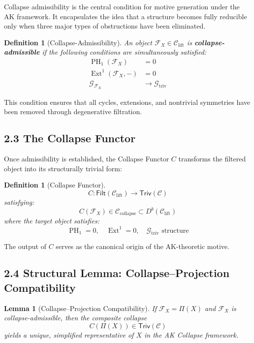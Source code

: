 \documentclass[11pt]{article}
\newtheorem{definition}[theorem]{Definition}
\newtheorem{lemma}[theorem]{Lemma}
\DeclareMathOperator{\Ext}{Ext}
\DeclareMathOperator{\PH}{PH}
\begin{document}
Collapse admissibility is the central condition for motive generation under the AK framework. It encapsulates the idea that a structure becomes fully reducible only when three major types of obstructions have been eliminated.

\begin{definition}[Collapse-Admissibility]
An object $\mathcal{F}_X \in \mathcal{C}_{\mathrm{lift}}$ is \textbf{collapse-admissible} if the following conditions are simultaneously satisfied:
\begin{align}
\PH_1(\mathcal{F}_X) &= 0 \tag{Topological Collapse} \\
\Ext^1(\mathcal{F}_X, -) &= 0 \tag{Categorical Collapse} \\
\mathcal{G}_{\mathcal{F}_X} &\rightarrow \mathcal{G}_{\mathrm{triv}} \tag{Group-Theoretic Collapse}
\end{align}
\end{definition}

This condition ensures that all cycles, extensions, and nontrivial symmetries have been removed through degenerative filtration.

\subsection{2.3 The Collapse Functor}

Once admissibility is established, the Collapse Functor $C$ transforms the filtered object into its structurally trivial form:

\begin{definition}[Collapse Functor]
\[
C: \mathsf{Filt}(\mathcal{C}_{\mathrm{lift}}) \longrightarrow \mathsf{Triv}(\mathcal{C})
\]
satisfying:
\[
C(\mathcal{F}_X) \in \mathcal{C}_{\mathrm{collapse}} \subset D^b(\mathcal{C}_{\mathrm{lift}})
\]
where the target object satisfies:
\[
\PH_1 = 0, \quad \Ext^1 = 0, \quad \mathcal{G}_{\mathrm{triv}} \text{ structure}
\]
\end{definition}

The output of $C$ serves as the canonical origin of the AK-theoretic motive.

\subsection{2.4 Structural Lemma: Collapse–Projection Compatibility}

\begin{lemma}[Collapse–Projection Compatibility]
If $\mathcal{F}_X = \Pi(X)$ and $\mathcal{F}_X$ is collapse-admissible, then the composite collapse
\[
C(\Pi(X)) \in \mathsf{Triv}(\mathcal{C})
\]
yields a unique, simplified representative of $X$ in the AK Collapse framework.
\end{lemma}
\end{document}
